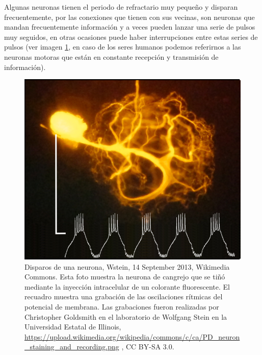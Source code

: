 Algunas neuronas tienen el periodo de refractario muy pequeño y disparan frecuentemente, por las conexiones que tienen con sus vecinas, son neuronas que mandan frecuentemente información y a veces pueden lanzar una serie de pulsos muy seguidos, en
otras ocasiones puede haber interrupciones entre estas series de pulsos (ver imagen \ref{fig:neuronStaining}, en caso de los seres humanos podemos referirnos a las neuronas motoras que están en constante recepción y transmisión de información).

\begin{figure}[h]
 \centering
 \includegraphics[scale=0.7]{../Figuras/neuron_staining_and_recording.png}
 \caption{Disparos de una neurona, Wstein, 14 September 2013, Wikimedia Commons. Esta foto muestra la neurona de cangrejo que se tiñó mediante la inyección intracelular de un colorante fluorescente. El recuadro muestra una grabación de las oscilaciones rítmicas del potencial de membrana. Las grabaciones fueron realizadas por Christopher Goldsmith en el laboratorio de Wolfgang Stein en la Universidad Estatal de Illinois, \url{https://upload.wikimedia.org/wikipedia/commons/c/ca/PD_neuron_staining_and_recording.png} , CC BY-SA 3.0.}
 \label{fig:neuronStaining}
\end{figure}


